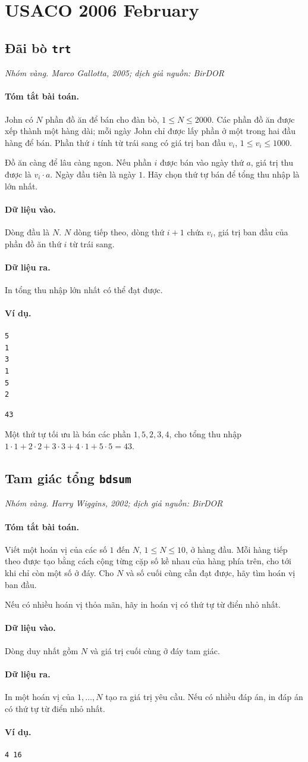 \documentclass[11pt]{article}
\newcommand{\problem}[4]{%
  \subsection[#1 (#2)]{#1 \hfill {\normalsize\texttt{#2}}}%
  \noindent\textit{#3. #4}\par\smallskip
}
\newcommand{\iosec}[1]{\paragraph{#1}}
\begin{document}
\section{USACO 2006 February}

\problem{Đãi bò}{trt}{Nhóm vàng}{Marco Gallotta, 2005; dịch giả nguồn: BirDOR}

\iosec{Tóm tắt bài toán.}
John có \(N\) phần đồ ăn để bán cho đàn bò, \(1\le N\le 2000\). Các phần đồ
ăn được xếp thành một hàng dài; mỗi ngày John chỉ được lấy phần ở một trong
hai đầu hàng để bán. Phần thứ \(i\) tính từ trái sang có giá trị ban đầu
\(v_i\), \(1\le v_i\le 1000\).

Đồ ăn càng để lâu càng ngon. Nếu phần \(i\) được bán vào ngày thứ \(a\), giá
trị thu được là \(v_i\cdot a\). Ngày đầu tiên là ngày \(1\). Hãy chọn thứ tự
bán để tổng thu nhập là lớn nhất.

\iosec{Dữ liệu vào.}
Dòng đầu là \(N\). \(N\) dòng tiếp theo, dòng thứ \(i+1\) chứa \(v_i\), giá
trị ban đầu của phần đồ ăn thứ \(i\) từ trái sang.

\iosec{Dữ liệu ra.}
In tổng thu nhập lớn nhất có thể đạt được.

\iosec{Ví dụ.}
\begin{verbatim}
5
1
3
1
5
2
\end{verbatim}

\begin{verbatim}
43
\end{verbatim}

Một thứ tự tối ưu là bán các phần \(1,5,2,3,4\), cho tổng thu nhập
\(1\cdot1+2\cdot2+3\cdot3+4\cdot1+5\cdot5=43\).

\problem{Tam giác tổng}{bdsum}{Nhóm vàng}{Harry Wiggins, 2002; dịch giả nguồn: BirDOR}

\iosec{Tóm tắt bài toán.}
Viết một hoán vị của các số \(1\) đến \(N\), \(1\le N\le 10\), ở hàng đầu.
Mỗi hàng tiếp theo được tạo bằng cách cộng từng cặp số kề nhau của hàng phía
trên, cho tới khi chỉ còn một số ở đáy. Cho \(N\) và số cuối cùng cần đạt
được, hãy tìm hoán vị ban đầu.

Nếu có nhiều hoán vị thỏa mãn, hãy in hoán vị có thứ tự từ điển nhỏ nhất.

\iosec{Dữ liệu vào.}
Dòng duy nhất gồm \(N\) và giá trị cuối cùng ở đáy tam giác.

\iosec{Dữ liệu ra.}
In một hoán vị của \(1,\ldots,N\) tạo ra giá trị yêu cầu. Nếu có nhiều đáp án,
in đáp án có thứ tự từ điển nhỏ nhất.

\iosec{Ví dụ.}
\begin{verbatim}
4 16
\end{verbatim}
\end{document}
